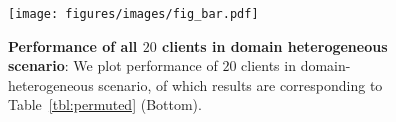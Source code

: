 \begin{figure}
    \centering
    \texttt{[image: figures/images/fig\_bar.pdf]}
    \caption{\textbf{Performance of all $20$ clients in domain heterogeneous scenario}: We plot performance of $20$ clients in domain-heterogeneous scenario, of which results are corresponding to Table~\ref{tbl:permuted} (Bottom). }
    \label{fig:bar}
\end{figure}